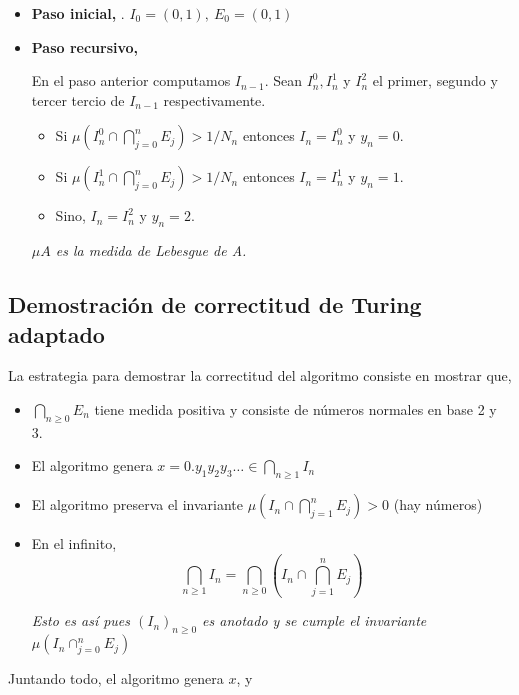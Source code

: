 \documentclass{article}
\theoremstyle{definition} %
\begin{document}
\begin{itemize}
    \item[] \textbf{Paso inicial,} . $I_0 = (0, 1),\ E_0 = (0, 1)$
    \item[] \textbf{Paso recursivo,} 
    
        En el paso anterior computamos $I_{n - 1}$. Sean $I_n^0, I_n^1$ y
        $I_n^2$ el primer, segundo y tercer tercio de $I_{n - 1}$
        respectivamente.
        \begin{itemize}
            \item Si $\mu \left( I_n^0 \cap \bigcap_{j = 0}^{n} E_j \right) >
            1/N_n$ entonces $I_n = I_n^0$ y $y_n = 0$.
            \item Si $\mu \left( I_n^1 \cap \bigcap_{j = 0}^{n} E_j \right) >
            1/N_n$ entonces $I_n = I_n^1$ y $y_n = 1$.
            \item Sino, $I_n = I_n^2$ y $y_n = 2$.
        \end{itemize}
        \textit{$\mu A$ es la medida de Lebesgue de A. }
\end{itemize}

\subsection*{Demostración de correctitud de Turing adaptado}

La estrategia para demostrar la correctitud del algoritmo consiste en mostrar
que,

\begin{itemize}
    \item $\bigcap_{n \geq 0} E_n$ tiene medida positiva y consiste de números
    normales en base 2 y 3.
    \item El algoritmo genera $x = 0.y_1 y_2 y_3 \ldots \in \bigcap_{n
    \geq 1} I_n$
    \item El algoritmo preserva el invariante
    $\mu \left( I_n \cap \bigcap^n_{j = 1} E_j \right) > 0$ (hay números)
    \item En el infinito,
    \[
        \bigcap_{n \geq 1} I_n = 
        \bigcap_{n \geq 0} \left( 
            I_n \cap \bigcap^n_{j = 1} E_j 
        \right)
    \]

    \textit{Esto es así pues $(I_n)_{n \geq 0}$ es anotado y se cumple el
    invariante $\mu(I_n \cap_{j=0}^n E_j)$}

\end{itemize}

Juntando todo, el algoritmo genera $x$, y
\end{document}
